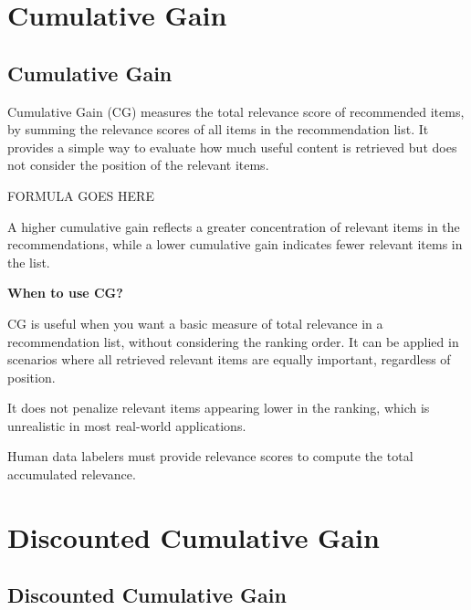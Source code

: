 \clearpage
\thispagestyle{rankingstyle}
\section{Cumulative Gain}
\subsection{Cumulative Gain}

Cumulative Gain (CG) measures the total relevance score of recommended items, by summing the relevance scores of all
items in the recommendation list. It provides a simple way to evaluate how much useful content is retrieved but
does not consider the position of the relevant items.

\begin{center}
    FORMULA GOES HERE
\end{center}

A higher cumulative gain reflects a greater concentration of relevant items in the recommendations,
while a lower cumulative gain indicates fewer relevant items in the list.

\textbf{When to use CG?}

CG is useful when you want a basic measure of total relevance in a recommendation list, without considering the ranking order.
It can be applied in scenarios where all retrieved relevant items are equally important, regardless of position.


{
    \item It does not penalize relevant items appearing lower in the ranking, which is
    unrealistic in most real-world applications.
    \item Human data labelers must provide relevance scores to compute the total accumulated relevance.

}


\clearpage
\thispagestyle{rankingstyle}
\section{Discounted Cumulative Gain}
\subsection{Discounted Cumulative Gain}

